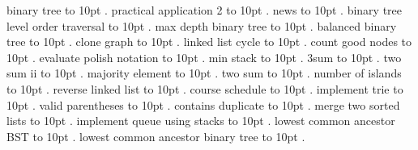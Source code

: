 
\pdfpagewidth=148mm
\pdfpageheight=210mm
\hsize=128mm
\vsize=190mm

\pdfhorigin=0pt
\pdfvorigin=0pt
\hoffset=10mm
\voffset=10mm
\noindent binary tree \leaders\hbox to 10pt {\hss.\hss}  \hfill {}
\smallskip
{} practical application 2 \leaders\hbox to 10pt {\hss.\hss}  \hfill {}
\smallskip
\noindent news \leaders\hbox to 10pt {\hss.\hss}  \hfill {}
\smallskip
{} binary tree level order traversal \leaders\hbox to 10pt {\hss.\hss}  \hfill {}
\smallskip
{} max depth binary tree \leaders\hbox to 10pt {\hss.\hss}  \hfill {}
\smallskip
{} balanced binary tree \leaders\hbox to 10pt {\hss.\hss}  \hfill {}
\smallskip
{} clone graph \leaders\hbox to 10pt {\hss.\hss}  \hfill {}
\smallskip
{} linked list cycle \leaders\hbox to 10pt {\hss.\hss}  \hfill {}
\smallskip
{} count good nodes \leaders\hbox to 10pt {\hss.\hss}  \hfill {}
\smallskip
{} evaluate polish notation \leaders\hbox to 10pt {\hss.\hss}  \hfill {}
\smallskip
{} min stack \leaders\hbox to 10pt {\hss.\hss}  \hfill {}
\smallskip
{} 3sum \leaders\hbox to 10pt {\hss.\hss}  \hfill {}
\smallskip
{} two sum ii \leaders\hbox to 10pt {\hss.\hss}  \hfill {}
\smallskip
{} majority element \leaders\hbox to 10pt {\hss.\hss}  \hfill {}
\smallskip
{} two sum \leaders\hbox to 10pt {\hss.\hss}  \hfill {}
\smallskip
{} number of islands \leaders\hbox to 10pt {\hss.\hss}  \hfill {}
\smallskip
{} reverse linked list \leaders\hbox to 10pt {\hss.\hss}  \hfill {}
\smallskip
{} course schedule \leaders\hbox to 10pt {\hss.\hss}  \hfill {}
\smallskip
{} implement trie \leaders\hbox to 10pt {\hss.\hss}  \hfill {}
\smallskip
{} valid parentheses \leaders\hbox to 10pt {\hss.\hss}  \hfill {}
\smallskip
{} contains duplicate \leaders\hbox to 10pt {\hss.\hss}  \hfill {}
\smallskip
{} merge two sorted lists \leaders\hbox to 10pt {\hss.\hss}  \hfill {}
\smallskip
{} implement queue using stacks \leaders\hbox to 10pt {\hss.\hss}  \hfill {}
\smallskip
{} lowest common ancestor BST \leaders\hbox to 10pt {\hss.\hss}  \hfill {}
\smallskip
{} lowest common ancestor binary tree \leaders\hbox to 10pt {\hss.\hss}  \hfill {}
